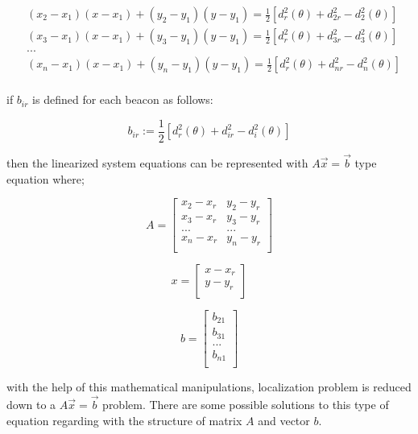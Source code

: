 \documentclass[twoside]{article}
\begin{document}
\begin{align*}
  & (x_2 - x_1)(x - x_1) + (y_2 - y_1)(y - y_1) = \frac{1}{2} [d_r^2(\theta) + d_{2r}^2 - d_2^2(\theta)] \\
  & (x_3 - x_1)(x - x_1) + (y_3 - y_1)(y - y_1) = \frac{1}{2} [d_r^2(\theta) + d_{3r}^2 - d_3^2(\theta)] \\
  & ... \\
  & (x_n - x_1)(x - x_1) + (y_n - y_1)(y - y_1) = \frac{1}{2} [d_r^2(\theta) + d_{nr}^2 - d_n^2(\theta)] \\
\end{align*}

if $b_{ir}$ is defined for each beacon as follows:

\begin{equation}
  b_{ir} := \frac{1}{2}[d_r^2(\theta) + d_{ir}^2 - d_i^2(\theta)]
\end{equation}

then the linearized system equations can be represented with $A\vec{x} = \vec{b}$ type equation where;

\begin{equation}
			A = \begin{bmatrix}
			x_2 - x_r & y_2 - y_r\\
			x_3 - x_r & y_3 - y_r\\
			...       & ...      \\
			x_n - x_r & y_n - y_r\\
			\end{bmatrix}				
\end{equation}

\begin{equation}
		x = \begin{bmatrix}
		x - x_r\\
		y - y_r\\
		\end{bmatrix}
\end{equation}

\begin{equation}
b = \begin{bmatrix}
b_{21}\\
b_{31}\\
... \\
b_{n1}\\
\end{bmatrix}
\end{equation}


with the help of this mathematical manipulations, localization problem is reduced down to a $A\vec{x} = \vec{b}$ problem.
There are some possible solutions to this type of equation regarding with the structure of matrix $A$ and vector $b$.
\end{document}
